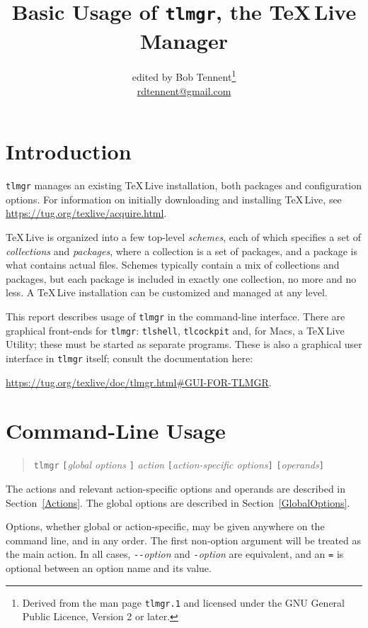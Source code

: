 \documentclass[11pt]{article}
\title{Basic Usage of \texttt{tlmgr}, the \TeX\,Live Manager}
\author{edited by Bob Tennent\thanks{\scriptsize Derived
from the man page \texttt{tlmgr.1} and licensed under
the GNU General Public Licence, Version 2 or later.}\\
\url{rdtennent@gmail.com}}
\begin{document}
\maketitle
\thispagestyle{empty}


\tableofcontents

\clearpage

\section{Introduction}

\texttt{tlmgr} manages an existing \TeX\,Live installation,
both packages and configuration options. For information
on initially downloading and installing \TeX\,Live, see
\url{https://tug.org/texlive/acquire.html}.

\TeX\,Live is organized into a few top-level
\textit{schemes}, each of which specifies a set of
\textit{collections} and \textit{packages}, where a
collection is a set of packages, and a package is what
contains actual files. Schemes typically contain a mix of
collections and packages, but each package is included in
exactly one collection, no more and no less. A \TeX\,Live
installation can be customized and managed at any level.


This report describes usage of \texttt{tlmgr} in the
command-line interface. There are graphical front-ends
for \texttt{tlmgr}: \texttt{tlshell}, \texttt{tlcockpit}
and, for Macs, a \TeX\,Live Utility; these must
be started as separate programs. These is also a
graphical user interface in \texttt{tlmgr} itself;
consult the documentation here: 
\begin{center}
  \url{https://tug.org/texlive/doc/tlmgr.html#GUI-FOR-TLMGR}.
\end{center}


\section{Command-Line Usage}


\begin{quote}
  \texttt{tlmgr} 
  \verb|[|\textit{global options} \verb|]| 
  \textit{action} 
  \verb|[|\textit{action-specific options}\verb|]|  
  \verb|[|\textit{operands}\verb|]|
\end{quote}
The actions and relevant action-specific options and
operands are described in Section~\ref{Actions}. The global
options are described in Section~\ref{GlobalOptions}.

Options, whether global or action-specific, may be
given anywhere on the command line, and in any order.
The first non-option argument will be treated as the
main action. In all cases, \verb|--|\textit{option} and
\verb|-|\textit{option} are equivalent, and an \verb|=| is
optional between an option name and its value.
\end{document}
